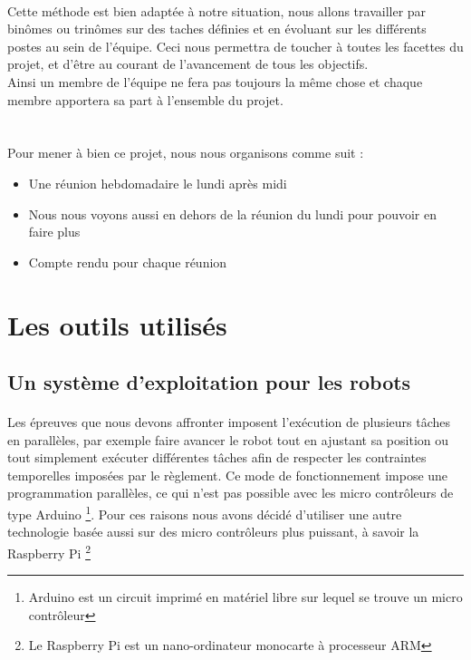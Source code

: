 \documentclass[12pt,a4paper]{article}
\begin{document}
\paragraph{}
Cette méthode est bien adaptée à notre situation, nous allons travailler par binômes ou trinômes sur des taches
définies et en évoluant sur les différents postes au sein de l'équipe. Ceci nous permettra de toucher à toutes les facettes du projet,
et d'être au courant de l'avancement de tous les objectifs.\\
Ainsi un membre de l'équipe ne fera pas toujours la même chose et chaque membre apportera sa part à l'ensemble du projet.\\ \\


\paragraph{}
Pour mener à bien ce projet, nous nous organisons comme suit :
\begin{itemize}
\item Une réunion hebdomadaire le lundi après midi 
\item Nous nous voyons aussi en dehors de la réunion du lundi pour pouvoir en faire plus
\item Compte rendu pour chaque réunion
\end{itemize}


\section{Les outils utilisés}

\subsection{Un système d'exploitation pour les robots}

\paragraph{}
Les épreuves que nous devons affronter imposent l'exécution de plusieurs tâches en parallèles, par exemple 
faire avancer le robot tout en ajustant sa position ou tout simplement exécuter différentes tâches
afin de respecter les contraintes temporelles imposées par le règlement. Ce mode de fonctionnement impose une 
programmation parallèles, ce qui n'est pas possible avec les micro contrôleurs de type 
Arduino \footnote{Arduino est un circuit imprimé en matériel libre sur lequel se trouve un micro contrôleur}.
Pour ces raisons nous avons décidé d'utiliser une autre technologie basée aussi sur des micro contrôleurs
plus puissant, à savoir la Raspberry Pi \footnote{Le Raspberry Pi est un nano-ordinateur monocarte à processeur ARM}
\end{document}
